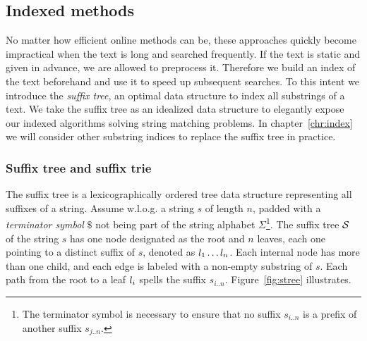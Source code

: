 
\subsection{Indexed methods}

No matter how efficient online methods can be, these approaches quickly become impractical when the text is long and searched frequently.
If the text is static and given in advance, we are allowed to preprocess it.
Therefore we build an index of the text beforehand and use it to speed up subsequent searches.
To this intent we introduce the \emph{suffix tree}, an optimal data structure to index all substrings of a text.
We take the suffix tree as an idealized data structure to elegantly expose our indexed algorithms solving string matching problems.
In chapter~\ref{chr:index} we will consider other substring indices to replace the suffix tree in practice.

\subsubsection{Suffix tree and suffix trie}

The suffix tree \citep{Morrison1968} is a lexicographically ordered tree data structure representing all suffixes of a string.
Assume w.l.o.g. a string $s$ of length $n$, padded with a \emph{terminator symbol} $\$$ not being part of the string alphabet $\Sigma$\footnote{The terminator symbol is necessary to ensure that no suffix $s_{i..n}$ is a prefix of another suffix $s_{j..n}$.}.
The suffix tree $\mathcal {S}$ of the string $s$ has one node designated as the root and $n$ leaves, each one pointing to a distinct suffix of $s$, denoted as $l_1 \dots l_n$.
Each internal node has more than one child, and each edge is labeled with a non-empty substring of $s$.
Each path from the root to a leaf $l_i$ spells the suffix $s_{i..n}$.
Figure~\ref{fig:stree} illustrates.



